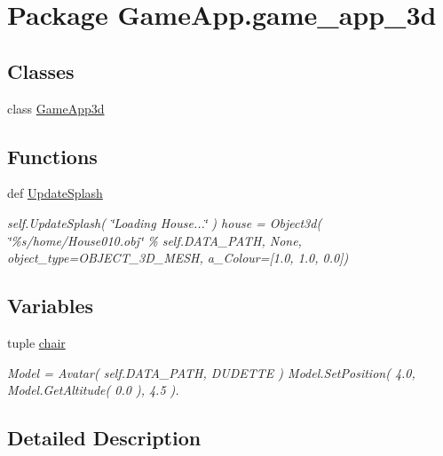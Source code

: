 \hypertarget{namespaceGameApp_1_1game__app__3d}{
\section{Package GameApp.game\_\-app\_\-3d}
\label{namespaceGameApp_1_1game__app__3d}
}


\subsection*{Classes}
\begin{CompactItemize}
\item 
class \hyperlink{classGameApp_1_1game__app__3d_1_1GameApp3d}{GameApp3d}
\end{CompactItemize}
\subsection*{Functions}
\begin{CompactItemize}
\item 
def \hyperlink{namespaceGameApp_1_1game__app__3d_4312b2008af9e7cc0986ea4ce9ad18c6}{UpdateSplash}
\begin{CompactList}\small\item\em self.UpdateSplash( \char`\"{}Loading House...\char`\"{} ) house = Object3d( \char`\"{}\%s/home/House010.obj\char`\"{} \% self.DATA\_\-PATH, None, object\_\-type=OBJECT\_\-3D\_\-MESH, a\_\-Colour=\mbox{[}1.0, 1.0, 0.0\mbox{]}) \item\end{CompactList}\end{CompactItemize}
\subsection*{Variables}
\begin{CompactItemize}
\item 
tuple \hyperlink{namespaceGameApp_1_1game__app__3d_e874969777b925453b3bfc5ba3b0bd59}{chair}
\begin{CompactList}\small\item\em Model = Avatar( self.DATA\_\-PATH, DUDETTE ) Model.SetPosition( 4.0, Model.GetAltitude( 0.0 ), 4.5 ). \item\end{CompactList}\end{CompactItemize}


\subsection{Detailed Description}


